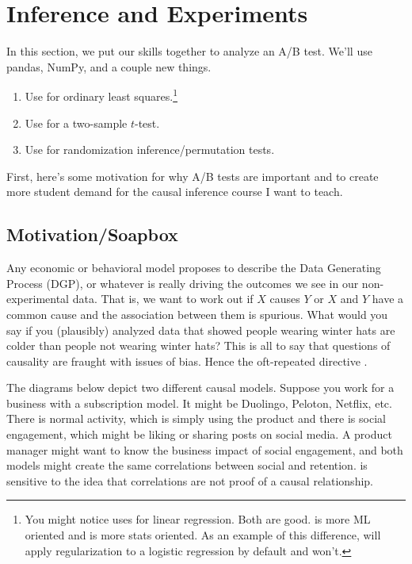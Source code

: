 \section{Inference and Experiments}

In this section, we put our skills together to analyze an A/B test. We'll use pandas, NumPy, and a couple new things.

\begin{enumerate}
    \item Use  for ordinary least squares.\footnote{You might notice \cite{vanderplas2016python} uses  for linear regression. Both are good.  is more ML oriented and  is more stats oriented. As an example of this difference,  will apply regularization to a logistic regression by default and  won't.}
    \item Use  for a two-sample $t$-test.
    \item Use  for randomization inference/permutation tests.
\end{enumerate}


First, here's some motivation for why A/B tests are important and to create more student demand for the causal inference course I want to teach. 

\subsection{Motivation/Soapbox}
Any economic or behavioral model proposes to describe the Data Generating Process (DGP), or whatever is really driving the outcomes we see in our non-experimental data. That is, we want to work out if $X$ causes $Y$ or $X$ and $Y$ have a common cause and the association between them is spurious. What would you say if you (plausibly) analyzed data that showed people wearing winter hats are colder than people not wearing winter hats? This is all to say that questions of causality are fraught with issues of bias. Hence the oft-repeated directive .

The diagrams below depict two different causal models. Suppose you work for a business with a subscription model. It might be Duolingo, Peloton, Netflix, etc. There is normal activity, which is simply using the product and there is social engagement, which might be liking or sharing posts on social media. A product manager might want to know the business impact of social engagement, and both models might create the same correlations between social and retention.  is sensitive to the idea that correlations are not proof of a causal relationship.

